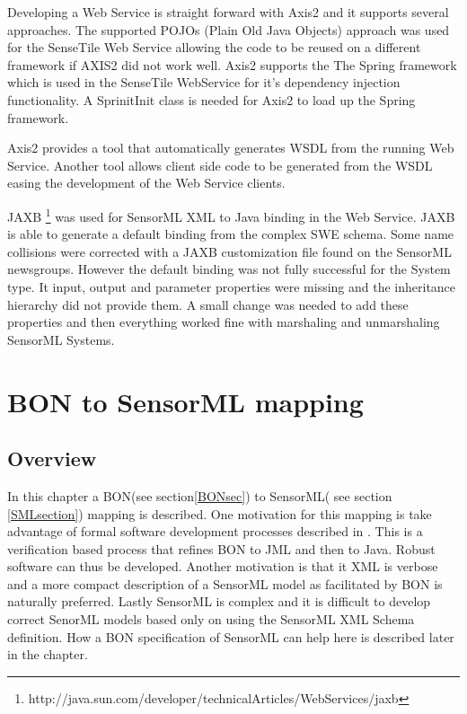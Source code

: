 \documentclass[]{final_report}
\begin{document}
Developing a Web Service is straight forward with Axis2 and it supports several approaches. The supported POJOs (Plain Old Java Objects) approach was used for the SenseTile Web Service allowing the code to be reused on a different framework if AXIS2 did not work well. Axis2 supports the The Spring framework which is used in the SenseTile WebService for it's dependency injection functionality. A SprinitInit class is needed for Axis2 to load up the Spring framework.

Axis2 provides a tool that automatically generates WSDL from the running Web Service. Another tool allows client side code to be generated from the WSDL easing the development of the Web Service clients.

JAXB \footnote{http://java.sun.com/developer/technicalArticles/WebServices/jaxb} was used for SensorML XML to Java binding in the Web Service. JAXB is able to generate a default binding from the complex SWE schema. Some name collisions were corrected with a JAXB customization file found on the SensorML newsgroups. However the default binding was not fully successful for the System type. It input, output and parameter properties were missing and the inheritance hierarchy did not provide them. A small change was needed to add these properties and then everything worked fine with marshaling and unmarshaling SensorML Systems. 

\chapter{BON to SensorML mapping}
\section{Overview}
In this chapter a BON(see section\ref{BONsec}) to SensorML( see section \ref{SMLsection}) mapping is described. One motivation for this mapping is take advantage of formal software development processes described in \cite{Kiniryref}. This is a verification based process that refines BON to JML and then to Java. Robust software can thus be developed. Another motivation is that it XML is verbose and a more compact description of a SensorML model as facilitated by BON is naturally preferred. Lastly SensorML is complex and it is difficult to develop correct SenorML models based only on using the SensorML XML Schema definition. How a BON specification of SensorML can help here is described later in the chapter.
\end{document}
